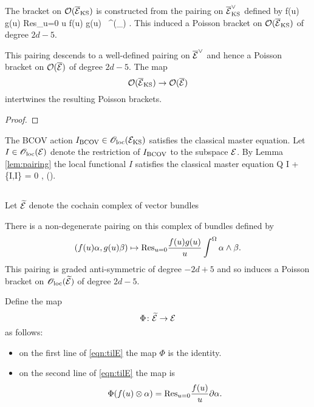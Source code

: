 \documentclass[11pt]{amsart}
\numberwithin{equation}{section}
\def\PV{{\rm PV}}
\def\div{\partial_\Omega}
\def\im{{\rm i}}
\def\til{\Tilde}
\begin{document}
The bracket on $\mathcal O(\overline{\mathcal E}_{\rm KS})$ is constructed from the pairing on $\overline{\mathcal E}^\vee_{\rm KS}$ defined by
\beqn\label{eqn:pairing}
f(u) \alpha \otimes g(u) \beta \mapsto \frac1{2\pi \im} {\rm Res}_{u=0} u f(u) g(u) \, \int^\Omega (\div \alpha) \beta .
\eeqn
This induced a Poisson bracket on $\mathcal O(\overline{\mathcal E}_{\rm KS})$ of degree $2d -5$. 

\begin{lem} \label{lem:pairing}
This pairing descends to a well-defined pairing on $\overline{\mathcal E}^\vee$ and hence a Poisson bracket on $\mathcal O(\overline{\mathcal E})$ of degree $2d-5$. 
The map 
\[
\mathcal O(\overline{\mathcal E}_{\rm KS}) \to \mathcal O(\overline{\mathcal E})
\]
intertwines the resulting Poisson brackets. 
\end{lem}
\begin{proof}
\end{proof}

The BCOV action $I_{\rm BCOV} \in {\mathscr O}_{\rm loc}(\mathcal E_{\rm KS})$ 
satisfies the classical master equation.
Let $I \in {\mathscr O}_{\rm loc}(\mathcal E)$ denote the restriction of $I_{\rm BCOV}$ to the subspace $\mathcal E$.
By Lemma \ref{lem:pairing} the local functional $I$ satisfies the classical master equation
\beqn\label{eqn:IE}
Q I +  \{I,I\} = 0 ,  \quad \oloc(\cE).
\eeqn 


\subsection{}

Let $\til{\cE}$ denote the cochain complex of vector bundles
\beqn\label{eqn:tilE}
\eeqn
There is a non-degenerate pairing on this complex of bundles defined by 
\[
(f(u) \alpha, g(u) \beta) \mapsto {\rm Res}_{u=0} \frac{f(u) g(u)}{u} \int^\Omega \alpha \wedge \beta .
\]
This pairing is graded anti-symmetric of degree $-2d+5$ and so induces a Poisson bracket on $\oloc(\til\cE)$ of degree $2d-5$.

Define the map
\[
\Phi\colon \til\cE \to \cE 
\]
as follows:
\begin{itemize}
\item on the first line of \eqref{eqn:tilE} the map $\Phi$ is the identity. 
\item on the second line of \eqref{eqn:tilE} the map is
\[
\Phi(f(u) \otimes \alpha) = {\rm Res}_{u=0} \frac{f(u)}{u} \partial \alpha .
\]
\end{itemize}
\end{document}
